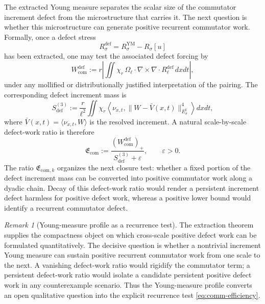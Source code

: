 \documentclass[11pt]{article}
\numberwithin{equation}{section}
\theoremstyle{plain}
\theoremstyle{definition}
\theoremstyle{remark}
\newtheorem{remark}[theorem]{Remark}
\begin{document}
The extracted Young measure separates the scalar size of the commutator increment defect from the microstructure that carries it.  The next question is whether this microstructure can generate positive recurrent commutator work.  Formally, once a defect stress
\[
R_\sigma^{\mathrm{def}}=R_\sigma^{\mathrm{YM}}-R_\sigma[u]
\]
has been extracted, one may test the associated defect forcing by
\begin{equation}\label{eq:comm-defect-work}
W_{\mathrm{com}}^{\mathrm{def}}
:=
r\left|
\iint \chi_r\,
\Omega_\ell\cdot \nabla\times\nabla\!\cdot R_\ell^{\mathrm{def}}\,dxdt
\right|,
\end{equation}
under any mollified or distributionally justified interpretation of the pairing.  The corresponding defect increment mass is
\begin{equation}\label{eq:S-def-3}
S_{\mathrm{def}}^{(3)}
:=
\frac r{\ell^2}
\iint \chi_r
\left\langle \nu_{x,t},
\|W-\bar V(x,t)\|_{E_\sigma^\sharp}^4
\right\rangle dxdt,
\end{equation}
where $\bar V(x,t)=\langle\nu_{x,t},W\rangle$ is the resolved increment.  A natural scale-by-scale defect-work ratio is therefore
\begin{equation}\label{eq:comm-efficiency}
\mathfrak E_{\mathrm{com}}
:=
\frac{(W_{\mathrm{com}}^{\mathrm{def}})_+}{S_{\mathrm{def}}^{(3)}+\varepsilon},
\qquad \varepsilon>0.
\end{equation}
The ratio $\mathfrak E_{\mathrm{com},k}$ organizes the next closure test: whether a fixed portion of the defect increment mass can be converted into positive commutator work along a dyadic chain.  Decay of this defect-work ratio would render a persistent increment defect harmless for positive defect work, whereas a positive lower bound would identify a recurrent commutator defect.

\begin{remark}[Young-measure profile as a recurrence test]\label{rem:young-not-positive-defect-work}
The extraction theorem supplies the compactness object on which cross-scale positive defect work can be formulated quantitatively.  The decisive question is whether a nontrivial increment Young measure can sustain positive recurrent commutator work from one scale to the next.  A vanishing defect-work ratio would rigidify the commutator term; a persistent defect-work ratio would isolate a candidate persistent positive defect work in any counterexample scenario.  Thus the Young-measure profile converts an open qualitative question into the explicit recurrence test \eqref{eq:comm-efficiency}.
\end{remark}
\end{document}
